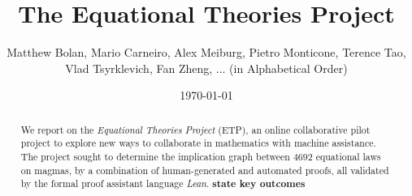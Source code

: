 \documentclass[12pt]{article}
\title{The Equational Theories Project}
\author{Matthew Bolan, Mario Carneiro, Alex Meiburg, Pietro Monticone, Terence Tao, Vlad Tsyrklevich, Fan Zheng, ... (in Alphabetical Order)}
\date{\today}
\theoremstyle{definition}
\newcommand{\note}[1]{{\bf #1}}
\begin{document}
\begin{abstract}
  We report on the \emph{Equational Theories Project} (ETP), an online collaborative pilot project
  to explore new ways to collaborate in mathematics with machine assistance. The project sought to
  determine the implication graph between $4692$ equational laws on magmas, by a combination of
  human-generated and automated proofs, all validated by the formal proof assistant language
  \emph{Lean}. \note{state key outcomes}
\end{abstract}

\maketitle

\tableofcontents















\appendix







\end{document}
